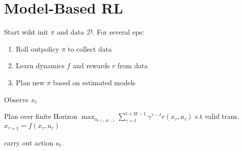 \section{Model-Based RL}
Start wiht init \(\pi\) and data \(\mathcal{D}\). For several eps:
\begin{enumerate}
    \item Roll outpolicy \(\pi\) to collect data
    \item Learn dynamics \(f\) and rewards \(r\) from data
    \item Plan new \(\pi\) based on estimated models
\end{enumerate}

\begin{definition}[MPC]
    \begin{enumerate*}
        \item Observe \(x_t\)
        \item Plan over finite Horizon \(\max_{a_{t:t+H-1}} \sum_{\tau = t}^{t + H - 1} \gamma^{\tau - t}r(x_\tau, a_\tau)\) s.t valid trans. \(x_{\tau + 1} = f(x_\tau, a_\tau)\)
        \item carry out action \(a_t\).
    \end{enumerate*}
\end{definition}